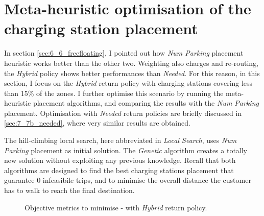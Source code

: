 \section{Meta-heuristic optimisation of the charging station placement}
\label{sec:7_7a_opt}

In section \ref{sec:6_6_freefloating},  I pointed out how \textit{Num Parking} placement heuristic works better than the other two.
Weighting also charges and re-routing, the \textit{Hybrid} policy shows better performances than \textit{Needed}. For this reason, in this section, I focus on the \textit{Hybrid} return policy with charging stations covering less than 15\% of the zones. I further optimise this scenario by running the meta-heuristic placement algorithms, and comparing the results with the \textit{Num Parking} placement. 
Optimisation with \textit{Needed} return policies are briefly discussed in \ref{sec:7_7b_needed}, where very similar results are obtained.  


The hill-climbing local search, here abbreviated in \textit{Local Search}, uses \textit{Num Parking} placement as initial solution. The \textit{Genetic} algorithm creates a totally new solution without exploiting any previous knowledge. 
Recall that both algorithms are designed to find the best charging stations placement that guarantee 0 infeasibile trips, and to minimise the overall distance the customer has to walk to reach the final destination.


\begin{figure}[th]
    \centering     %
    \label{fig:7_7a_opt_metrics}
    \caption{Objective metrics to minimise - with \textit{Hybrid} return policy.}
\end{figure}

